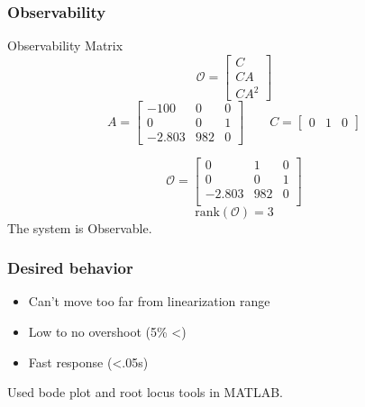 \documentclass{beamer}
\begin{document}
\begin{frame}
\frametitle{Observability}
Observability Matrix
$$ \mathcal{O} = \begin{bmatrix} C \\ CA \\ CA^2 \end{bmatrix} $$
$$
A =
\begin{bmatrix}
-100 & 0 & 0 \\
0 & 0 & 1 \\
-2.803 & 982 & 0
\end{bmatrix}
\qquad C = \begin{bmatrix} 0 & 1 & 0\end{bmatrix}
$$

$$
\mathcal{O} =
\begin{bmatrix}
0 & 1 & 0 \\
0 & 0 & 1 \\
-2.803 & 982 & 0 \\
\end{bmatrix}
$$
$$ \text{rank}(\mathcal{O}) = 3 $$
The system is Observable.
\end{frame}

\begin{frame}
\frametitle{Desired behavior}
\begin{itemize}[$\bullet$]
\item Can't move too far from linearization range
\item Low to no overshoot (5\% <)
\item Fast response (<.05s)
\end{itemize}
Used bode plot and root locus tools in MATLAB.
\end{frame}

\begin{frame}
\frametitle{Choosing Poles}

\begin{figure}
\centering
\texttt{[image: \{../images/bode\_root\_locus\_plots]}.png}
\end{figure}

$$p_1 = -20+20i \qquad p_2 = -20-20i \qquad p_3 = -100 $$
$$ (s-(-20+20i))(s-(-20+20i))(s-(-100)) $$
$$ s^3 + 140s^2 +4800s + 80000 $$
\end{frame}
\end{document}
